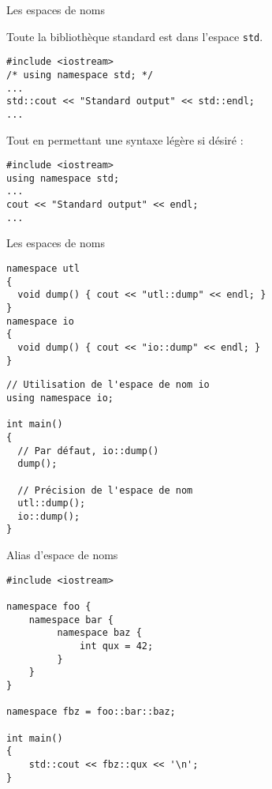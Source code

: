 \documentclass[c]{beamer}
\begin{document}
\begin{frame}[fragile]{Les espaces de noms}

Toute la bibliothèque standard est dans l'espace \texttt{std}.
\vspace{1em}

\begin{verbatim}
#include <iostream>
/* using namespace std; */
...
std::cout << "Standard output" << std::endl;
...
\end{verbatim}

\vspace{1em}
Tout en permettant une syntaxe légère si désiré :
\vspace{1em}

\begin{verbatim}
#include <iostream>
using namespace std;
...
cout << "Standard output" << endl;
...
\end{verbatim}

\end{frame}


\begin{frame}[fragile]{Les espaces de noms}
 \begin{verbatim}
namespace utl
{
  void dump() { cout << "utl::dump" << endl; }
}
namespace io
{
  void dump() { cout << "io::dump" << endl; }
}
\end{verbatim}
\pause
\begin{verbatim}
// Utilisation de l'espace de nom io
using namespace io;

int main()
{
  // Par défaut, io::dump()
  dump();

  // Précision de l'espace de nom
  utl::dump();
  io::dump();
}
\end{verbatim}
\end{frame}

\begin{frame}[fragile]{Alias d'espace de noms}
\begin{verbatim}
#include <iostream>
 
namespace foo {
    namespace bar {
         namespace baz {
             int qux = 42;
         }
    }
}
 
namespace fbz = foo::bar::baz;
 
int main()
{
    std::cout << fbz::qux << '\n';
}
\end{verbatim}
\end{frame}
\end{document}
